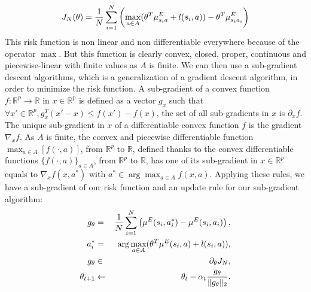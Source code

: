 \documentclass{article}
\begin{document}
\begin{equation}
\label{structure.eqn}
J_N(\theta)  = {1\over N} \sum_{i=1}^N\left(\max_{a\in A}(\theta ^T \mu^E_{s_ia} + l(s_i,a)) - \theta ^T \mu^E_{s_ia_i} \right)
\end{equation}
This risk function is non linear and non differentiable everywhere because of the operator $\max$. But this function is clearly convex, closed, proper, continuous and piecewise-linear with finite values as $A$ is finite. We can then use a sub-gradient descent algorithms, which is a generalization of a gradient descent algorithm, in order to minimize the risk function. A sub-gradient of a convex function  $f:\mathbb{R}^p\rightarrow \mathbb{R}$ in $x\in\mathbb{R}^p$ is defined as a vector $g_x$ such that $\forall x' \in \mathbb{R}^p, g_x^T(x'-x)\leq f(x')-f(x)$, the set of all sub-gradients in $x$ is $\partial_xf$. The unique sub-gradient in $x$ of a differentiable convex function $f$ is the gradient $\nabla_xf$. As $A$ is finite, the convex and piecewise differentiable function $\max_{a\in A}[f(\cdot,a)]$, from $\mathbb{R}^p$ to $\mathbb{R}$, defined thanks to the convex differentiable functions $\{f(\cdot,a)\}_{a\in A}$, from $\mathbb{R}^p$ to $\mathbb{R}$,  has one of its sub-gradient in $x\in\mathbb{R}^p$ equals to $\nabla_xf(x,a^*)$ with $a^*\in\arg\max_{a\in A}f(x,a)$. Applying these rules, we have a sub-gradient of our risk function and an update rule for our sub-gradient algorithm:
\begin{eqnarray}
\label{algorithm}
g_{\theta} &=& {1\over N}\sum\limits_{i=1}^N\left(\mu^E(s_i,a^*_i) - \mu^E(s_i,a_i)\right),\\
a^*_i &=& \arg\max_{a\in A}(\theta ^T \mu^E(s_i,a) + l(s_i,a)),\\
g_{\theta} &\in& \partial_\theta J_N,\\
\theta_{t+1} &\leftarrow& \theta_t -\alpha_t\frac{g_{\theta}}{\|g_{\theta}\|_2}.
\end{eqnarray}
\end{document}

